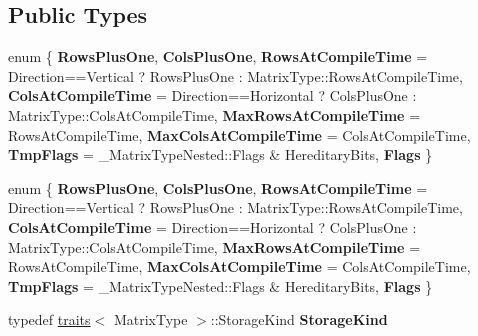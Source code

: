 \subsection*{Public Types}
\begin{DoxyCompactItemize}
\item 
\mbox{\label{struct_eigen_1_1internal_1_1traits_3_01_homogeneous_3_01_matrix_type_00_01_direction_01_4_01_4_adeaa894259de221efdf0f6ca61494689}} 
enum \{ \newline
{\bfseries Rows\+Plus\+One}, 
{\bfseries Cols\+Plus\+One}, 
{\bfseries Rows\+At\+Compile\+Time} = Direction==Vertical ? Rows\+Plus\+One \+: Matrix\+Type\+:\+:Rows\+At\+Compile\+Time, 
{\bfseries Cols\+At\+Compile\+Time} = Direction==Horizontal ? Cols\+Plus\+One \+: Matrix\+Type\+:\+:Cols\+At\+Compile\+Time, 
\newline
{\bfseries Max\+Rows\+At\+Compile\+Time} = Rows\+At\+Compile\+Time, 
{\bfseries Max\+Cols\+At\+Compile\+Time} = Cols\+At\+Compile\+Time, 
{\bfseries Tmp\+Flags} = \+\_\+\+Matrix\+Type\+Nested\+:\+:Flags \& Hereditary\+Bits, 
{\bfseries Flags}
 \}
\item 
\mbox{\label{struct_eigen_1_1internal_1_1traits_3_01_homogeneous_3_01_matrix_type_00_01_direction_01_4_01_4_af8827be0db71cf0b1824744e46be5ad4}} 
enum \{ \newline
{\bfseries Rows\+Plus\+One}, 
{\bfseries Cols\+Plus\+One}, 
{\bfseries Rows\+At\+Compile\+Time} = Direction==Vertical ? Rows\+Plus\+One \+: Matrix\+Type\+:\+:Rows\+At\+Compile\+Time, 
{\bfseries Cols\+At\+Compile\+Time} = Direction==Horizontal ? Cols\+Plus\+One \+: Matrix\+Type\+:\+:Cols\+At\+Compile\+Time, 
\newline
{\bfseries Max\+Rows\+At\+Compile\+Time} = Rows\+At\+Compile\+Time, 
{\bfseries Max\+Cols\+At\+Compile\+Time} = Cols\+At\+Compile\+Time, 
{\bfseries Tmp\+Flags} = \+\_\+\+Matrix\+Type\+Nested\+:\+:Flags \& Hereditary\+Bits, 
{\bfseries Flags}
 \}
\item 
\mbox{\label{struct_eigen_1_1internal_1_1traits_3_01_homogeneous_3_01_matrix_type_00_01_direction_01_4_01_4_aed4bdbb49e3568372c304dceb4e71f20}} 
typedef \hyperlink{struct_eigen_1_1internal_1_1traits}{traits}$<$ Matrix\+Type $>$\+::Storage\+Kind {\bfseries Storage\+Kind}

\end{DoxyCompactItemize}
